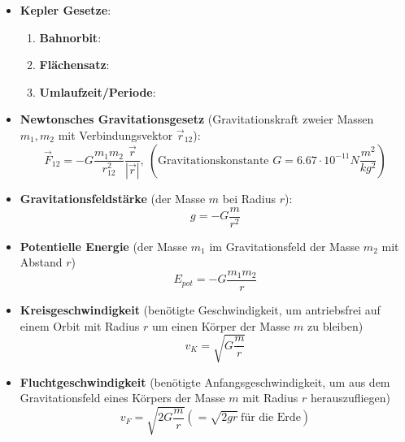 \begin{itemize}
	\item \textbf{Kepler Gesetze}:
	\begin{enumerate}
		\item \textbf{Bahnorbit}: 
		\item \textbf{Flächensatz}: 
		\item \textbf{Umlaufzeit/Periode}: 
	\end{enumerate}
	\item \textbf{Newtonsches Gravitationsgesetz} (Gravitationskraft zweier Massen $m_1, m_2$ mit Verbindungsvektor $\vec{r}_{12}$):
	\begin{equation}
		\vec{F}_{12} = -G\frac{m_1m_2}{r_{12}^2} \frac{\vec{r}}{|\vec{r}|},\ (\text{Gravitationskonstante } G = 6.67 \cdot 10^{-11}N\frac{m^2}{kg^2})
	\end{equation}
	\item \textbf{Gravitationsfeldstärke} (der Masse $m$ bei Radius $r$):
	\begin{equation}
		g = -G\frac{m}{r^2}
	\end{equation}
	\item \textbf{Potentielle Energie} (der Masse $m_1$ im Gravitationsfeld der Masse $m_2$ mit Abstand $r$)
	\begin{equation}
		E_{pot} = -G\frac{m_1m_2}{r}
	\end{equation}
	\item \textbf{Kreisgeschwindigkeit} (benötigte Geschwindigkeit, um antriebsfrei auf einem Orbit mit Radius $r$ um einen Körper der Masse $m$ zu bleiben)
	\begin{equation}
		v_K = \sqrt{G\frac{m}{r}}
	\end{equation}
	\item \textbf{Fluchtgeschwindigkeit} (benötigte Anfangsgeschwindigkeit, um aus dem Gravitationsfeld eines Körpers der Masse $m$ mit Radius $r$ herauszufliegen)
	\begin{equation}
		v_F = \sqrt{2G\frac{m}{r}} (= \sqrt{2gr}\ \text{für die Erde})
	\end{equation}
\end{itemize}

\newpage
